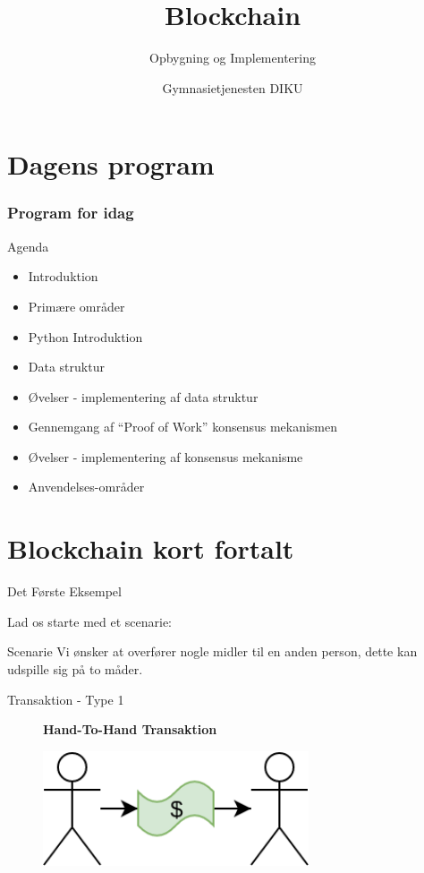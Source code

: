 \documentclass[12pt,t]{beamer}
\title{Blockchain}
\subtitle{Opbygning og Implementering}
\author{Gymnasietjenesten DIKU}
\institute{Department of Computer Science}
\begin{document}
\frame[plain]{\titlepage}
\frame{\tableofcontents}

\section{Dagens program}
\begin{frame}
    \frametitle{Program for idag}
    \begin{block}{Agenda}
        \begin{itemize}        	
            \item Introduktion
            \item Primære områder
            \item Python Introduktion 
            \item Data struktur 
            \item Øvelser - implementering af data struktur
            \item Gennemgang af “Proof of Work” konsensus mekanismen
            \item Øvelser - implementering af konsensus mekanisme
            \item Anvendelses-områder
        \end{itemize}
    \end{block}
\end{frame}

\section{Blockchain kort fortalt}

\begin{frame}[c]{Det Første Eksempel}

Lad os starte med et scenarie:
\begin{block}{Scenarie}
	Vi ønsker at overfører nogle midler til en anden person, dette kan udspille sig på to måder.
\end{block}

\end{frame}

\begin{frame}[c]{Transaktion - Type 1}
\begin{figure}
	\centering
	\textbf{Hand-To-Hand Transaktion}\par\medskip
	\includegraphics[width=0.7\textwidth]{b_ill1.png}
\end{figure}
\end{frame}
\end{document}
